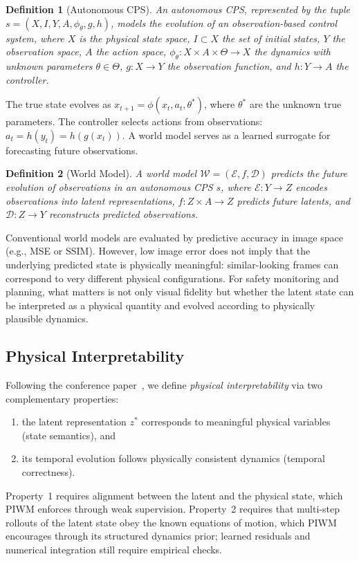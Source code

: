\documentclass[preprint,12pt]{elsarticle}
\newtheorem{definition}{Definition}
\newcommand{\zstar}{z^{*}}   %
\begin{document}
\begin{definition}[Autonomous CPS]
An \emph{autonomous CPS}, represented by the tuple $s = (X, I, Y, A, \phi_{\theta}, g, h)$, models the
evolution of an observation-based control system, where $X$ is the physical
state space, $I \subset X$ the set of initial states, $Y$ the observation space,
$A$ the action space, $\phi_{\theta}: X \times A \times \Theta \rightarrow X$ the
dynamics with unknown parameters $\theta \in \Theta$, $g: X \rightarrow Y$ the
observation function, and $h: Y \rightarrow A$ the controller.
\end{definition}

The true state evolves as $x_{t+1} = \phi(x_t, a_t, \theta^*)$, where $\theta^*$
are the unknown true parameters.
The controller selects actions from observations: $a_t = h(y_t) = h(g(x_t))$.
A world model serves as a learned surrogate for forecasting future observations.

\begin{definition}[World Model]
A \emph{world model} $\mathcal{W} = (\mathcal{E}, f, \mathcal{D})$ predicts the
future evolution of observations in an autonomous CPS $s$, where
$\mathcal{E}: Y \rightarrow Z$ encodes observations into latent representations,
$f: Z \times A \rightarrow Z$ predicts future latents, and
$\mathcal{D}: Z \rightarrow Y$ reconstructs predicted observations.
\end{definition}

Conventional world models are evaluated by predictive accuracy in image space
(e.g., MSE or SSIM).
However, low image error does not imply that the underlying predicted state is
physically meaningful: similar-looking frames can correspond to very different
physical configurations.
For safety monitoring and planning, what matters is not only visual fidelity but
whether the latent state can be interpreted as a physical quantity and evolved
according to physically plausible dynamics.

\subsection{Physical Interpretability}

Following the conference paper~\cite{piwm_conf}, we define \emph{physical
interpretability} via two complementary properties:
\begin{enumerate}
    \item the latent representation $\zstar$ corresponds to meaningful physical
    variables (state semantics), and
    \item its temporal evolution follows physically consistent dynamics
    (temporal correctness).
\end{enumerate}
Property~1 requires alignment between the latent and the physical state, which
PIWM enforces through weak supervision.
Property~2 requires that multi-step rollouts of the latent state obey the known
equations of motion, which PIWM encourages through its structured dynamics prior; learned residuals and numerical integration still require empirical checks.
\end{document}
